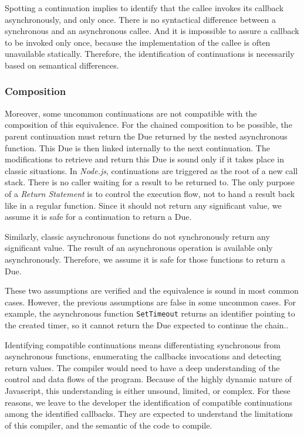 Spotting a continuation implies to identify that the callee invokes its callback asynchronously, and only once.
There is no syntactical difference between a synchronous and an asynchronous callee.
And it is impossible to assure a callback to be invoked only once, because the implementation of the callee is often unavailable statically.
Therefore, the identification of continuations is necessarily based on semantical differences.

\subsubsection{Composition}

Moreover, some uncommon continuations are not compatible with the composition of this equivalence.
For the chained composition to be possible, the parent continuation must return the Due returned by the nested asynchronous function.
This Due is then linked internally to the next continuation.
The modifications to retrieve and return this Due is sound only if it takes place in classic situations.
In \textit{Node.js}, continuations are triggered as the root of a new call stack.
There is no caller waiting for a result to be returned to.
The only purpose of a \textit{Return Statement} is to control the execution flow, not to hand a result back like in a regular function.
Since it should not return any significant value, we assume it is safe for a continuation to return a Due.

Similarly, classic asynchronous functions do not synchronously return any significant value.
The result of an asynchronous operation is available only asynchronously.
Therefore, we assume it is safe for those functions to return a Due.

These two assumptions are verified and the equivalence is sound in most common cases.
However, the previous assumptions are false in some uncommon cases.
For example, the asynchronous function \texttt{SetTimeout} returns an identifier pointing to the created timer, so it cannot return the Due expected to continue the chain..

Identifying compatible continuations means differentiating synchronous from asynchronous functions, enumerating the callbacks invocations and detecting return values.
The compiler would need to have a deep understanding of the control and data flows of the program.
Because of the highly dynamic nature of Javascript, this understanding is either unsound, limited, or complex.
For these reasons, we leave to the developer the identification of compatible continuations among the identified callbacks.
They are expected to understand the limitations of this compiler, and the semantic of the code to compile.

